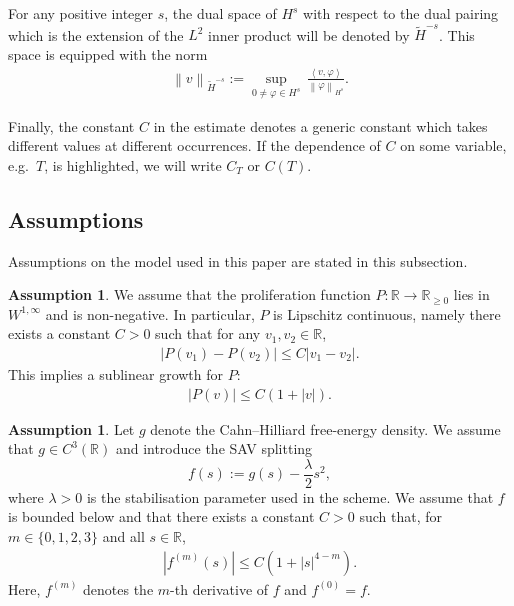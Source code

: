 \documentclass[11pt, reqno]{amsart}
\theoremstyle{definition}
\newtheorem{assumption}[theorem]{Assumption}
\numberwithin{equation}{section}
\newcommand{\bb}{\mathbb}
\newcommand{\norm}[2]{\left\|{#1}\right\|_{#2}}
\newcommand{\inpro}[2]{\left\langle#1,#2\right\rangle}
\newcommand{\abs}[1]{\left|{#1}\right|}
\begin{document}
For any positive integer $s$, the dual space of $H^s$ with respect to the dual pairing which is the extension of the $L^2$ inner product will be denoted by $\widetilde{H}^{-s}$. This space is equipped with the norm
\begin{align*}
	\norm{v}{\widetilde{H}^{-s}}:= \sup_{0\neq \varphi\in H^s}\, \frac{\inpro{v}{\varphi}}{\norm{\varphi}{H^s}}.
\end{align*}

Finally, the constant $C$ in the estimate denotes a generic constant which takes different values at different occurrences. If
the dependence of $C$ on some variable, e.g.~$T$, is highlighted, we will write $C_T$ or
$C(T)$.


\subsection{Assumptions}

Assumptions on the model used in this paper are stated in this subsection.

\begin{assumption}\label{ass:assum P}
We assume that the proliferation function $P:\bb{R}\to \bb{R}_{\geq 0}$ lies in $W^{1,\infty}$ and is non-negative. In particular, $P$ is Lipschitz continuous, namely there exists a constant $C>0$ such that for any $v_1,v_2\in \bb{R}$,
\begin{align}\label{equ:P lipschitz}
	\abs{P(v_1)-P(v_2)} \leq C\abs{v_1-v_2}.
\end{align}
This implies a sublinear growth for $P$:
\begin{align}\label{equ:P sublin}
	\abs{P(v)} \leq C\left(1+\abs{v}\right).
\end{align}
\end{assumption}

\begin{assumption}\label{ass:assum f}
	{Let $g$ denote the Cahn--Hilliard free-energy density. We assume that
	$g\in C^3(\bb{R})$ and introduce the SAV splitting
	\[
	f(s):=g(s)-\frac{\lambda}{2}s^2,
	\]
	where $\lambda>0$ is the stabilisation parameter used in the scheme.} We assume
	that $f$ is bounded below and that there exists a constant $C>0$ such that, for
	$m\in\{0,1,2,3\}$ and all $s\in\bb{R}$,
	\begin{align}
		\label{equ:f der bound}
		\abs{f^{(m)}(s)}
		\leq
		C\left(1+\abs{s}^{4-m}\right).
	\end{align}
	Here, $f^{(m)}$ denotes the $m$-th derivative of $f$ and $f^{(0)}=f$.
\end{assumption}
\end{document}
